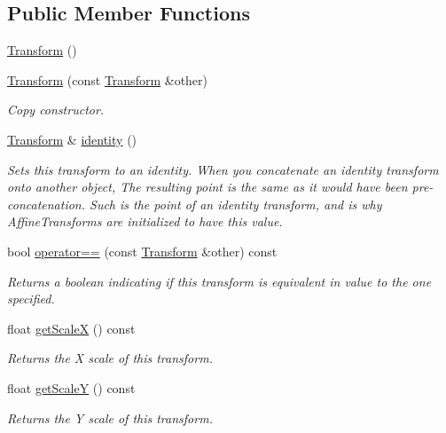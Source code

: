 \subsection*{Public Member Functions}
\begin{DoxyCompactItemize}
\item 
\hyperlink{classcturtle_1_1Transform_a8b3953d07dfbe1f41ef5074144106d32}{Transform} ()
\item 
\hyperlink{classcturtle_1_1Transform_a007759937e9ad468e5ea41687571a417}{Transform} (const \hyperlink{classcturtle_1_1Transform}{Transform} \&other)
\begin{DoxyCompactList}\small\item\em Copy constructor. \end{DoxyCompactList}\item 
\hyperlink{classcturtle_1_1Transform}{Transform} \& \hyperlink{classcturtle_1_1Transform_a0102d86a459937597b4755650b94b4a2}{identity} ()
\begin{DoxyCompactList}\small\item\em Sets this transform to an identity. When you concatenate an identity transform onto another object, The resulting point is the same as it would have been pre-\/concatenation. Such is the point of an identity transform, and is why Affine\+Transforms are initialized to have this value. \end{DoxyCompactList}\item 
\mbox{\label{classcturtle_1_1Transform_a77fe29e1fbf23aec97f988ca5f1bd3c3}} 
bool \hyperlink{classcturtle_1_1Transform_a77fe29e1fbf23aec97f988ca5f1bd3c3}{operator==} (const \hyperlink{classcturtle_1_1Transform}{Transform} \&other) const
\begin{DoxyCompactList}\small\item\em Returns a boolean indicating if this transform is equivalent in value to the one specified. \end{DoxyCompactList}\item 
float \hyperlink{classcturtle_1_1Transform_ac7ab4863a65f6ee7d222be6bb01cc54c}{get\+ScaleX} () const
\begin{DoxyCompactList}\small\item\em Returns the X scale of this transform. \end{DoxyCompactList}\item 
float \hyperlink{classcturtle_1_1Transform_a7a47c8a4e32edfcccd871187dbd9680e}{get\+ScaleY} () const
\begin{DoxyCompactList}\small\item\em Returns the Y scale of this transform. \end{DoxyCompactList}\item 

\end{DoxyCompactItemize}
